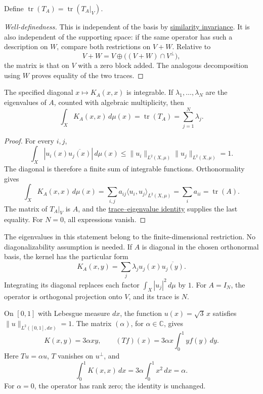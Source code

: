 \begin{definition}\label{finite-kernel-trace-definition}
Define $\operatorname{tr}(T_A)=\operatorname{tr}(T_A|_V)$.
\end{definition}

\begin{proof}[Well-definedness]
This is independent of the basis by \hyperref[linear-algebra.trace-similarity]{similarity invariance}. It is also independent of the supporting space: if the same operator has such a description on $W$, compare both restrictions on $V+W$. Relative to
\[
V+W=V\oplus\bigl((V+W)\cap V^\perp\bigr),
\]
the matrix is that on $V$ with a zero block added. The analogous decomposition using $W$ proves equality of the two traces.
\end{proof}

\begin{proposition}\label{finite-kernel-trace-identity}
The specified diagonal $x\mapsto K_A(x,x)$ is integrable. If $\lambda_1,\ldots,\lambda_N$ are the eigenvalues of $A$, counted with algebraic multiplicity, then
\[
\boxed{\int_X K_A(x,x)\,d\mu(x)
=\operatorname{tr}(T_A)
=\sum_{j=1}^N\lambda_j.}
\]
\end{proposition}

\begin{proof}
For every $i,j$,
\[
\int_X|u_i(x)\overline{u_j(x)}|\,d\mu(x)
\leq\|u_i\|_{L^2(X,\mu)}\|u_j\|_{L^2(X,\mu)}=1.
\]
The diagonal is therefore a finite sum of integrable functions. Orthonormality gives
\[
\int_X K_A(x,x)\,d\mu(x)
=\sum_{i,j}a_{ij}\langle u_i,u_j\rangle_{L^2(X,\mu)}
=\sum_i a_{ii}
=\operatorname{tr}(A).
\]
The matrix of $T_A|_V$ is $A$, and the \hyperref[linear-algebra.trace-eigenvalue-sum]{trace--eigenvalue identity} supplies the last equality. For $N=0$, all expressions vanish.
\end{proof}

The eigenvalues in this statement belong to the finite-dimensional restriction. No diagonalizability assumption is needed. If $A$ is diagonal in the chosen orthonormal basis, the kernel has the particular form
\[
K_A(x,y)=\sum_j\lambda_j u_j(x)\overline{u_j(y)}.
\]
Integrating its diagonal replaces each factor $\int_X|u_j|^2\,d\mu$ by $1$. For $A=I_N$, the operator is orthogonal projection onto $V$, and its trace is $N$.

\begin{example}\label{finite-kernel-rank-one-example}

On $[0,1]$ with Lebesgue measure $dx$, the function $u(x)=\sqrt3\,x$ satisfies $\|u\|_{L^2([0,1],dx)}=1$. The matrix $(\alpha)$, for $\alpha\in\mathbb C$, gives
\[
K(x,y)=3\alpha xy,
\qquad
(Tf)(x)=3\alpha x\int_0^1 yf(y)\,dy.
\]
Here $Tu=\alpha u$, $T$ vanishes on $u^\perp$, and
\[
\int_0^1K(x,x)\,dx=3\alpha\int_0^1x^2\,dx=\alpha.
\]
For $\alpha=0$, the operator has rank zero; the identity is unchanged.
\end{example}

